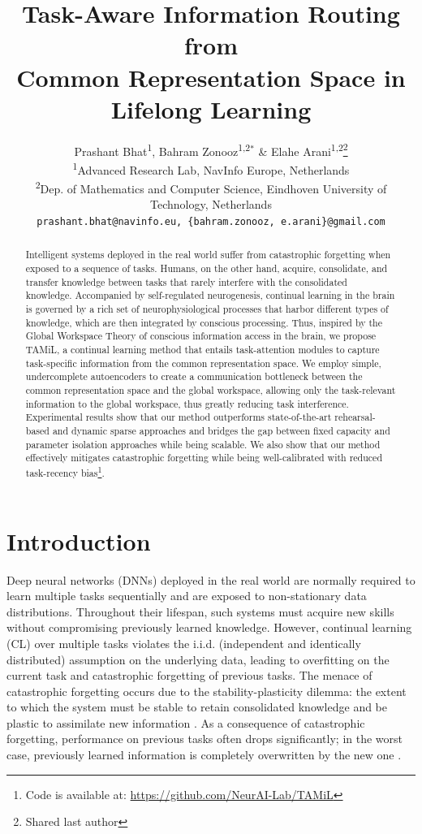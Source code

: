 \documentclass{article} %
\title{Task-Aware Information Routing from \\ Common Representation Space in \\ Lifelong Learning}
\author{Prashant Bhat\textsuperscript{\rm 1}, Bahram Zonooz\textsuperscript{\rm 1,2}$^*$ \& Elahe Arani\textsuperscript{\rm 1,2}\thanks{Shared last author} \\
 \textsuperscript{\rm 1}Advanced Research Lab, NavInfo Europe, Netherlands\\
\textsuperscript{\rm 2}Dep. of Mathematics and Computer Science, Eindhoven University of Technology, Netherlands\\
\texttt{prashant.bhat@navinfo.eu, \{bahram.zonooz, e.arani\}@gmail.com} \\
}
\begin{document}
\maketitle

\begin{abstract}
Intelligent systems deployed in the real world suffer from catastrophic forgetting when exposed to a sequence of tasks. Humans, on the other hand, acquire, consolidate, and transfer knowledge between tasks that rarely interfere with the consolidated knowledge.  Accompanied by self-regulated neurogenesis, continual learning in the brain is governed by a rich set of neurophysiological processes that harbor different types of knowledge, which are then integrated by conscious processing. Thus, inspired by the Global Workspace Theory of conscious information access in the brain, we propose TAMiL, a continual learning method that entails task-attention modules to capture task-specific information from the common representation space. We employ simple, undercomplete autoencoders to create a communication bottleneck between the common representation space and the global workspace, allowing only the task-relevant information to the global workspace, thus greatly reducing task interference. Experimental results show that our method outperforms state-of-the-art rehearsal-based and dynamic sparse approaches and bridges the gap between fixed capacity and parameter isolation approaches while being scalable. We also show that our method effectively mitigates catastrophic forgetting while being well-calibrated with reduced task-recency bias\footnote{Code is available at: \url{https://github.com/NeurAI-Lab/TAMiL}}.
\end{abstract}

\section{Introduction}
Deep neural networks (DNNs) deployed in the real world are normally required to learn multiple tasks sequentially and are exposed to non-stationary data distributions. Throughout their lifespan, such systems must acquire new skills without compromising previously learned knowledge. However, continual learning (CL) over multiple tasks violates the i.i.d. (independent and identically distributed) assumption on the underlying data, leading to overfitting on the current task and catastrophic forgetting of previous tasks. The menace of catastrophic forgetting occurs due to the stability-plasticity dilemma: the extent to which the system must be stable to retain consolidated knowledge and be plastic to assimilate new information \citep{mermillod2013stability}. As a consequence of catastrophic forgetting, performance on previous tasks often drops significantly; in the worst case, previously learned information is completely overwritten by the new one \citep{parisi2019continual}. 
\end{document}
